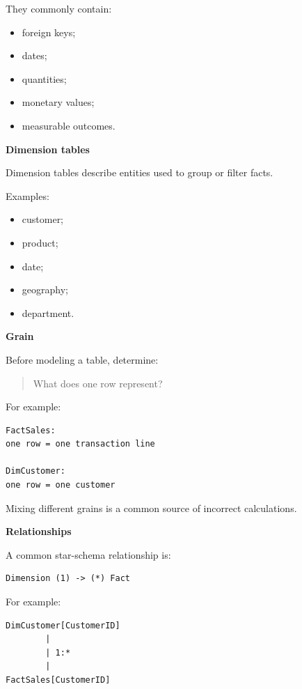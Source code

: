 \documentclass[11pt,letterpaper]{article}
\begin{document}
They commonly contain:

\begin{itemize}[leftmargin=*]
    \item foreign keys;
    \item dates;
    \item quantities;
    \item monetary values;
    \item measurable outcomes.
\end{itemize}

\textbf{Dimension tables}

Dimension tables describe entities used to group or filter facts.

Examples:

\begin{itemize}[leftmargin=*]
    \item customer;
    \item product;
    \item date;
    \item geography;
    \item department.
\end{itemize}

\textbf{Grain}

Before modeling a table, determine:

\begin{quote}
What does one row represent?
\end{quote}

For example:

\begin{lstlisting}
FactSales:
one row = one transaction line

DimCustomer:
one row = one customer
\end{lstlisting}

Mixing different grains is a common source of incorrect calculations.



\textbf{Relationships}

A common star-schema relationship is:

\begin{lstlisting}
Dimension (1) -> (*) Fact
\end{lstlisting}

For example:

\begin{lstlisting}
DimCustomer[CustomerID]
        |
        | 1:*
        |
FactSales[CustomerID]
\end{lstlisting}
\end{document}
